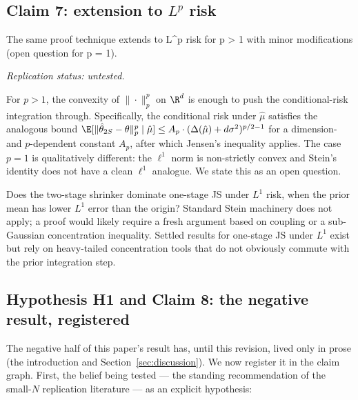 \documentclass{rrxiv}
\begin{document}
\subsection*{Claim 7: extension to $L^p$ risk}
\begin{claim}[title=Claim 7, type=theoretical, evidence=argument, confidence=0.8, rationale={argued via convexity of the p-norm for p greater than 1; the full derivation is not written out in this paper and the p=1 case is explicitly open}, assumptions={p strictly greater than 1}]
\label{claim:c7}
The same proof technique extends to L\textasciicircum{}p risk for p \textgreater{} 1 with minor modifications (open question for p = 1).

\emph{Replication status: untested.}
\end{claim}

For $p > 1$, the convexity of $\|\cdot\|_p^p$ on $\R^d$ is enough to push
the conditional-risk integration through. Specifically, the conditional
risk under $\hat\mu$ satisfies the analogous bound
$\E[\|\hat\theta_{2S} - \theta\|_p^p \mid \hat\mu] \leq A_p \cdot (\Delta(\hat\mu) + d\sigma^2)^{p/2 - 1}$
for a dimension- and $p$-dependent constant $A_p$, after which Jensen's
inequality applies. The case $p = 1$ is qualitatively different: the
$\ell^1$ norm is non-strictly convex and Stein's identity does not have a
clean $\ell^1$ analogue. We state this as an open question.

\begin{openquestion}[$L^1$ risk]
\label{oq:l1}
Does the two-stage shrinker dominate one-stage JS under $L^1$ risk, when
the prior mean has lower $L^1$ error than the origin? Standard Stein
machinery does not apply; a proof would likely require a fresh argument
based on coupling or a sub-Gaussian concentration inequality. Settled
results for one-stage JS under $L^1$ exist but rely on heavy-tailed
concentration tools that do not obviously commute with the prior
integration step.
\end{openquestion}

\subsection*{Hypothesis H1 and Claim 8: the negative result, registered}

The negative half of this paper's result has, until this revision, lived
only in prose (the introduction and Section~\ref{sec:discussion}). We now
register it in the claim graph. First, the belief being tested --- the
standing recommendation of the small-$N$ replication literature --- as an
explicit hypothesis:
\end{document}
